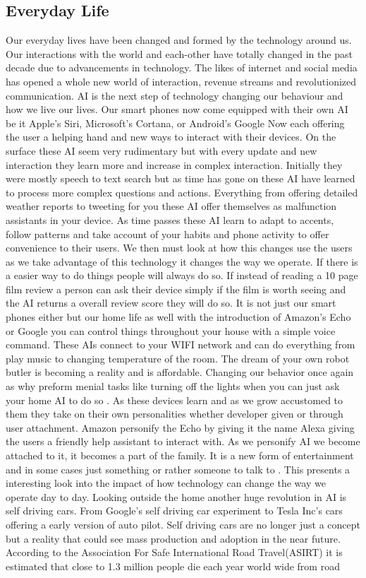 \documentclass[conference]{IEEEtran}
\begin{document}
\subsection{Everyday Life}
Our everyday lives have been changed and formed by the technology around us. Our interactions with the world and each-other have totally changed in the past decade due to advancements in technology. The likes of internet and social media has opened a whole new world of interaction, revenue streams and revolutionized communication. AI is the next step of technology changing our behaviour and how we live our lives. Our smart phones now come equipped with their own AI be it Apple's Siri, Microsoft's Cortana, or Android's Google Now each offering the user a helping hand and new ways to interact with their devices. On the surface these AI seem very rudimentary but with every update and new interaction they learn more and increase in complex interaction. Initially they were mostly speech to text search but as time has gone on these AI have learned to process more complex questions and actions. Everything from offering detailed weather reports to tweeting for you these AI offer themselves as malfunction assistants in your device. As time passes these AI learn to adapt to accents, follow patterns and take account of your habits and phone activity to offer convenience to their users. We then must look at how this changes use the users as we take advantage of this technology it changes the way we operate. If there is a easier way to do things people will always do so. If instead of reading a 10 page film review a person can ask their device simply if the film is worth seeing and the AI returns a overall review score they will do so. It is not just our smart phones either but our home life as well with the introduction of Amazon's Echo or Google you can control things throughout your house with a simple voice command. These AIs connect to your WIFI network and can do everything from play music to changing temperature of the room. The dream of your own robot butler is becoming a reality and is affordable. Changing our behavior once again as why preform menial tasks like turning off the lights when you can just ask your home AI to do so \cite{SmartHome}. As these devices learn and as we grow accustomed to them they take on their own personalities whether developer given or through user attachment. Amazon personify the Echo by giving it the name Alexa giving the users a friendly help assistant to interact with. As we personify AI we become attached to it, it becomes a part of the family. It is a new form of entertainment and in some cases just something or rather someone to talk to \cite{Personality}. This presents a interesting look into the impact of how technology can change the way we operate day to day. Looking outside the home another huge revolution in AI is self driving cars. From Google's self driving car experiment to Tesla Inc's cars offering a early version of auto pilot. Self driving cars are no longer just a concept but a reality that could see mass production and adoption in the near future. According to the Association For Safe International Road Travel(ASIRT) it is estimated that close to 1.3 million people die each year world wide from road 
\end{document}
